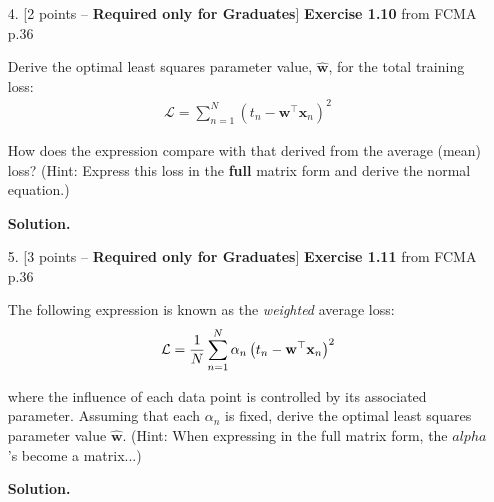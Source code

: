 \documentclass[10pt]{article}
\begin{document}
\begin{itemize}



\item[4.] [2 points -- {\bf Required only for Graduates}] 
{\bf Exercise 1.10} from FCMA p.36

Derive the optimal least squares parameter value, $\mathbf{\hat{w}}$, for the total training loss:
\begin{eqnarray*}
\mathcal{L} = \sum_{n=1}^N \left( t_n - \mathbf{w}^\top \mathbf{x}_n \right)^2
\end{eqnarray*}

How does the expression compare with that derived from the average (mean) loss?  (Hint: Express this loss in the {\bf full} matrix form and derive the normal equation.)

{\bf Solution.} 




\item[5.] [3 points -- {\bf Required only for Graduates}]
{\bf Exercise 1.11} from FCMA p.36

The following expression is known as the {\em weighted} average loss:
\begin{eqnarray*}
\mathcal{L} = {1 \over N} \sum_{n=1}^N \alpha_n \left( t_n - \mathbf{w}^\top \mathbf{x}_n \right)^2
\end{eqnarray*}

where the influence of each data point is controlled by its associated parameter.  Assuming that each $\alpha_n$ is fixed, derive the optimal least squares parameter value $\mathbf{\hat{w}}$.  (Hint: When expressing in the full matrix form, the $alpha$'s become a matrix...)

{\bf Solution.} 



\end{itemize}
\end{document}
